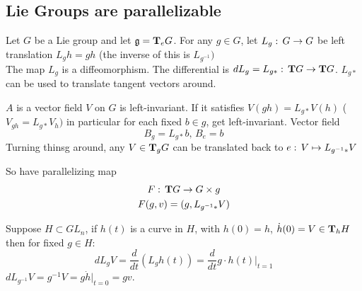 \subsection{Lie Groups are parallelizable}
Let $G$ be a Lie group and let $\mathfrak{g} = \text{\textbf{T}}_eG$. For any $g\in G$, let $L_g:\, G\to G$ be left translation $L_gh = gh$ (the inverse of this is $L_{g^{-1}})$\\
The map $L_g$ is a diffeomorphism. The differential is $dL_g=L_{g*}:\, \text{\textbf{T}} G \to \text{\textbf{T}} G$. $L_{g*}$ can be used to translate tangent vectors around.

\begin{ddef}
$A$ is a vector field $V$ on $G$ is left-invariant. If it satisfies $V(gh)=L_{g*}V(h)$ ($V_{gh} = L_{g*}V_h)$ in particular for each fixed $b\in g$, get left-invariant. Vector field
$$B_g = L_{g*}b ,\, B_e=b$$
Turning thinsg around, any $V\in \text{\textbf{T}}_gG$ can be translated back to $e:\, V \mapsto L_{g^{-1}*} V$ 
\end{ddef}

So have parallelizing map 
\begin{gather*}
F:\, \text{\textbf{T}} G \to G\times g\\
F(g,v) = (g, L_{g^{-1}*}V)
\end{gather*}

Suppose $H\subset GL_n$, if $h(t)$ is a curve in $H$, with $h(0)=h$, $\dot h(0) =V \in \text{\textbf{T}}_hH$ then for fixed $g\in H$:
$$dL_gV = \frac{d}{dt} \left( L_gh(t) \right) = \frac{d}{dt} g\cdot h(t) |_{t=1}$$
$dL_{g^{-1}} V = g^{-1}V = g\dot h |_{t=0} = gv$.
